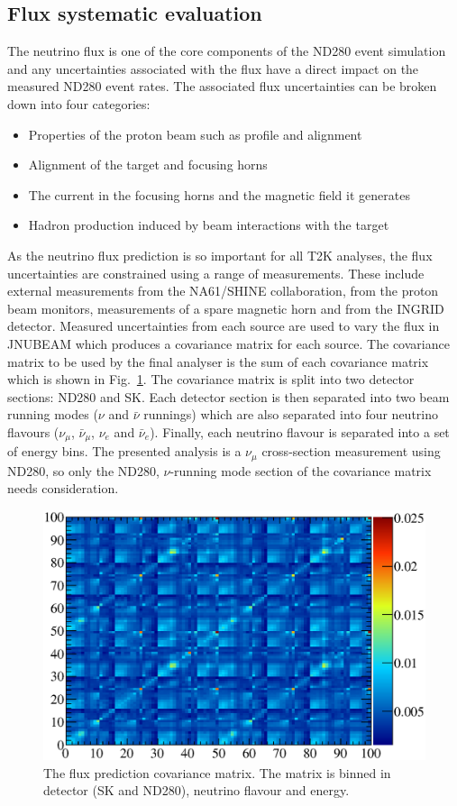 \subsection{Flux systematic evaluation}
\label{subsec:FluxSystematic}
The neutrino flux is one of the core components of the ND280 event simulation and any uncertainties associated with the flux have a direct impact on the measured ND280 event rates.  The associated flux uncertainties can be broken down into four categories:
\begin{itemize}
  \item Properties of the proton beam such as profile and alignment
  \item Alignment of the target and focusing horns
  \item The current in the focusing horns and the magnetic field it generates
  \item Hadron production induced by beam interactions with the target
\end{itemize}
As the neutrino flux prediction is so important for all T2K analyses, the flux uncertainties are constrained using a range of measurements.  These include external measurements from the NA61/SHINE collaboration, from the proton beam monitors, measurements of a spare magnetic horn and from the INGRID detector.  Measured uncertainties from each source are used to vary the flux in JNUBEAM which produces a covariance matrix for each source.  The covariance matrix to be used by the final analyser is the sum of each covariance matrix which is shown in Fig.~\ref{fig:FluxPredictionSyst}.  The covariance matrix is split into two detector sections: ND280 and SK.  Each detector section is then separated into two beam running modes ($\nu$ and $\bar{\nu}$ runnings) which are also separated into four neutrino flavours ($\nu_\mu$, $\bar{\nu}_\mu$, $\nu_e$ and $\bar{\nu}_e$).  Finally, each neutrino flavour is separated into a set of energy bins.  The presented analysis is a $\nu_\mu$ cross-section measurement using ND280, so only the ND280, $\nu$-running mode section of the covariance matrix needs consideration.
\begin{figure}
  \centering
  \includegraphics[width=12cm]{images/measurement/systematics/flux/flux_prediction_syst.eps}
  \caption{The flux prediction covariance matrix.  The matrix is binned in detector (SK and ND280), neutrino flavour and energy.}
  \label{fig:FluxPredictionSyst}
\end{figure}
